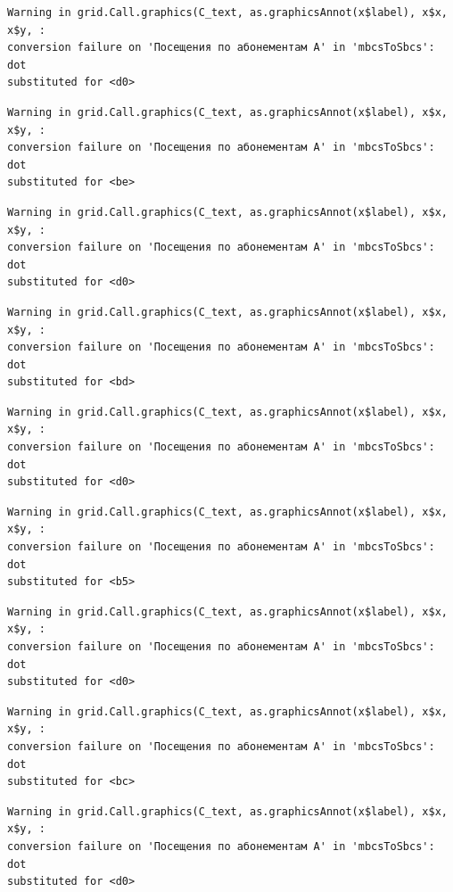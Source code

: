 \documentclass[
  letterpaper,
  DIV=11,
  numbers=noendperiod]{scrartcl}
\begin{document}
\begin{verbatim}
Warning in grid.Call.graphics(C_text, as.graphicsAnnot(x$label), x$x, x$y, :
conversion failure on 'Посещения по абонементам А' in 'mbcsToSbcs': dot
substituted for <d0>
\end{verbatim}

\begin{verbatim}
Warning in grid.Call.graphics(C_text, as.graphicsAnnot(x$label), x$x, x$y, :
conversion failure on 'Посещения по абонементам А' in 'mbcsToSbcs': dot
substituted for <be>
\end{verbatim}

\begin{verbatim}
Warning in grid.Call.graphics(C_text, as.graphicsAnnot(x$label), x$x, x$y, :
conversion failure on 'Посещения по абонементам А' in 'mbcsToSbcs': dot
substituted for <d0>
\end{verbatim}

\begin{verbatim}
Warning in grid.Call.graphics(C_text, as.graphicsAnnot(x$label), x$x, x$y, :
conversion failure on 'Посещения по абонементам А' in 'mbcsToSbcs': dot
substituted for <bd>
\end{verbatim}

\begin{verbatim}
Warning in grid.Call.graphics(C_text, as.graphicsAnnot(x$label), x$x, x$y, :
conversion failure on 'Посещения по абонементам А' in 'mbcsToSbcs': dot
substituted for <d0>
\end{verbatim}

\begin{verbatim}
Warning in grid.Call.graphics(C_text, as.graphicsAnnot(x$label), x$x, x$y, :
conversion failure on 'Посещения по абонементам А' in 'mbcsToSbcs': dot
substituted for <b5>
\end{verbatim}

\begin{verbatim}
Warning in grid.Call.graphics(C_text, as.graphicsAnnot(x$label), x$x, x$y, :
conversion failure on 'Посещения по абонементам А' in 'mbcsToSbcs': dot
substituted for <d0>
\end{verbatim}

\begin{verbatim}
Warning in grid.Call.graphics(C_text, as.graphicsAnnot(x$label), x$x, x$y, :
conversion failure on 'Посещения по абонементам А' in 'mbcsToSbcs': dot
substituted for <bc>
\end{verbatim}

\begin{verbatim}
Warning in grid.Call.graphics(C_text, as.graphicsAnnot(x$label), x$x, x$y, :
conversion failure on 'Посещения по абонементам А' in 'mbcsToSbcs': dot
substituted for <d0>
\end{verbatim}
\end{document}
